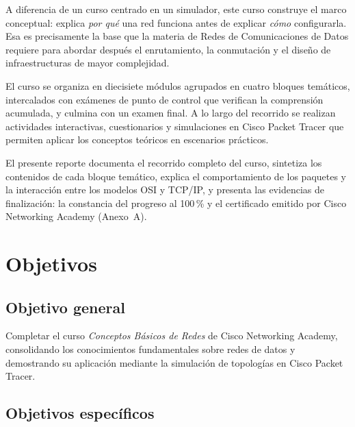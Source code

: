 \documentclass[11pt,a4paper]{article}
\begin{document}
A diferencia de un curso centrado en un simulador, este curso construye el
marco conceptual: explica \emph{por qué} una red funciona antes de explicar
\emph{cómo} configurarla. Esa es precisamente la base que la materia de Redes
de Comunicaciones de Datos requiere para abordar después el enrutamiento, la
conmutación y el diseño de infraestructuras de mayor complejidad.

El curso se organiza en diecisiete módulos agrupados en cuatro bloques
temáticos, intercalados con exámenes de punto de control que verifican la
comprensión acumulada, y culmina con un examen final. A lo largo del recorrido
se realizan actividades interactivas, cuestionarios y simulaciones en Cisco
Packet Tracer que permiten aplicar los conceptos teóricos en escenarios
prácticos.

El presente reporte documenta el recorrido completo del curso, sintetiza los
contenidos de cada bloque temático, explica el comportamiento de los paquetes
y la interacción entre los modelos OSI y TCP/IP, y presenta las evidencias de
finalización: la constancia del progreso al 100\,\% y el certificado emitido
por Cisco Networking Academy (Anexo~A).

\section{Objetivos}

\subsection{Objetivo general}

Completar el curso \textit{Conceptos Básicos de Redes} de Cisco Networking
Academy, consolidando los conocimientos fundamentales sobre redes de datos y
demostrando su aplicación mediante la simulación de topologías en Cisco Packet
Tracer.

\subsection{Objetivos específicos}
\end{document}
